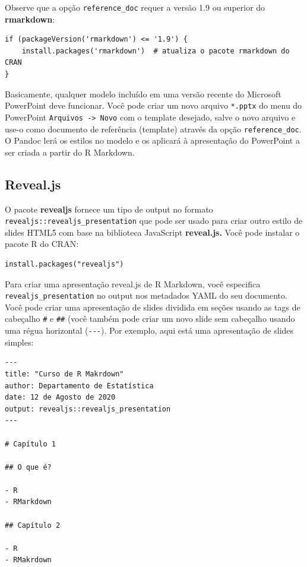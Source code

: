 \documentclass[
]{book}
\begin{document}
Observe que a opção \texttt{reference\_doc} requer a versão 1.9 ou superior do \textbf{rmarkdown}:

\begin{verbatim}
if (packageVersion('rmarkdown') <= '1.9') {
    install.packages('rmarkdown')  # atualiza o pacote rmarkdown do CRAN
}
\end{verbatim}

Basicamente, qualquer modelo incluído em uma versão recente do Microsoft PowerPoint deve funcionar. Você pode criar um novo arquivo \texttt{*.pptx} do menu do PowerPoint \texttt{Arquivos\ -\textgreater{}\ Novo} com o template desejado, salve o novo arquivo e use-o como documento de referência (template) através da opção \texttt{reference\_doc}. O Pandoc lerá os estilos no modelo e os aplicará à apresentação do PowerPoint a ser criada a partir do R Markdown.

\hypertarget{reveal.js}{%
\subsection{Reveal.js}\label{reveal.js}}

O pacote \textbf{revealjs} fornece um tipo de output no formato \texttt{revealjs::revealjs\_presentation} que pode ser usado para criar outro estilo de slides HTML5 com base na biblioteca JavaScript \textbf{reveal.js.} Você pode instalar o pacote R do CRAN:

\begin{verbatim}
install.packages("revealjs")
\end{verbatim}

Para criar uma apresentação reveal.js de R Markdown, você especifica \texttt{revealjs\_presentation} no output nos metadados YAML do seu documento. Você pode criar uma apresentação de slides dividida em seções usando as tags de cabeçalho \texttt{\#} e \texttt{\#\#} (você também pode criar um novo slide sem cabeçalho usando uma régua horizontal (\texttt{-\/-\/-}). Por exemplo, aqui está uma apresentação de slides simples:

\begin{verbatim}
---
title: "Curso de R Makrdown"
author: Departamento de Estatística
date: 12 de Agosto de 2020
output: revealjs::revealjs_presentation
---

# Capítulo 1

## O que é?

- R
- RMarkdown

## Capítulo 2

- R
- RMakrdown
\end{verbatim}
\end{document}
